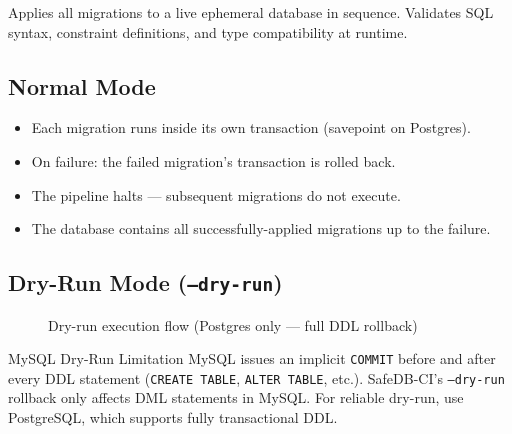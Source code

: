 \documentclass[12pt,a4paper]{report}
\begin{document}
Applies all migrations to a live ephemeral database in sequence. Validates SQL
syntax, constraint definitions, and type compatibility at runtime.

\subsection{Normal Mode}

\begin{itemize}
  \item Each migration runs inside its own transaction (savepoint on Postgres).
  \item On failure: the failed migration's transaction is rolled back.
  \item The pipeline halts — subsequent migrations do not execute.
  \item The database contains all successfully-applied migrations up to the failure.
\end{itemize}

\subsection{Dry-Run Mode (\texttt{--dry-run})}

\begin{figure}[H]
\centering
{}
\caption{Dry-run execution flow (Postgres only — full DDL rollback)}
\end{figure}

\begin{warningbox}{MySQL Dry-Run Limitation}
MySQL issues an implicit \texttt{COMMIT} before and after every DDL statement
(\texttt{CREATE TABLE}, \texttt{ALTER TABLE}, etc.). SafeDB-CI's \texttt{--dry-run}
rollback only affects DML statements in MySQL. For reliable dry-run, use PostgreSQL,
which supports fully transactional DDL.
\end{warningbox}
\end{document}

